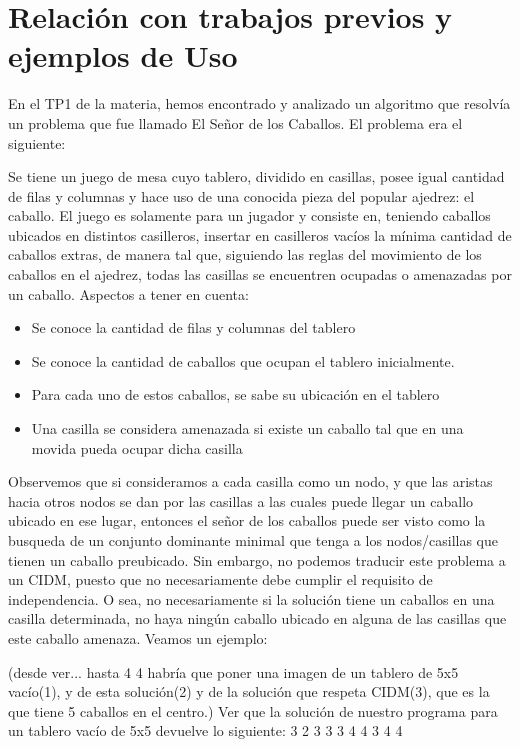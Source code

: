 \documentclass[a4paper]{article}
\begin{document}
\section{Relación con trabajos previos y ejemplos de Uso}

En el TP1 de la materia, hemos encontrado y analizado un algoritmo que resolvía un problema que fue llamado El Señor de los Caballos. El problema era el siguiente:

Se tiene un juego de mesa cuyo tablero, dividido en casillas, posee igual cantidad de filas y columnas y hace uso de una conocida pieza del popular ajedrez: el caballo. El juego es solamente para un jugador y consiste en, teniendo caballos ubicados en distintos casilleros, insertar en casilleros vacíos la mínima cantidad de caballos extras, de manera tal que, siguiendo las reglas del movimiento de los caballos en el ajedrez, todas las casillas se encuentren ocupadas o amenazadas por un caballo.
Aspectos a tener en cuenta:

\begin{itemize}
   \item Se conoce la cantidad de filas y columnas del tablero
   \item Se conoce la cantidad de caballos que ocupan el tablero inicialmente.
   \item Para cada uno de estos caballos, se sabe su ubicación en el tablero
   \item Una casilla se considera amenazada si existe un caballo tal que en una movida pueda ocupar dicha casilla
\end{itemize}

Observemos que si consideramos a cada casilla como un nodo, y que las aristas hacia otros nodos se dan por las casillas a las cuales puede llegar un caballo ubicado en ese lugar, entonces el señor de los caballos puede ser visto como la busqueda de un conjunto dominante minimal que tenga a los nodos/casillas que tienen un caballo preubicado. Sin embargo, no podemos traducir este problema a un CIDM, puesto que no necesariamente debe cumplir el requisito de independencia. O sea, no necesariamente si la solución tiene un caballos en una casilla determinada, no haya ningún caballo ubicado en alguna de las casillas que este caballo amenaza. Veamos un ejemplo:

(desde ver... hasta 4 4 habría que poner una imagen de un tablero de 5x5 vacío(1), y de esta solución(2) y de la solución que respeta CIDM(3), que es la que tiene 5 caballos en el centro.)
Ver que la solución de nuestro programa para un tablero vacío de 5x5 devuelve lo siguiente:
3 2 
3 3 
3 4 
4 3 
4 4
\end{document}
